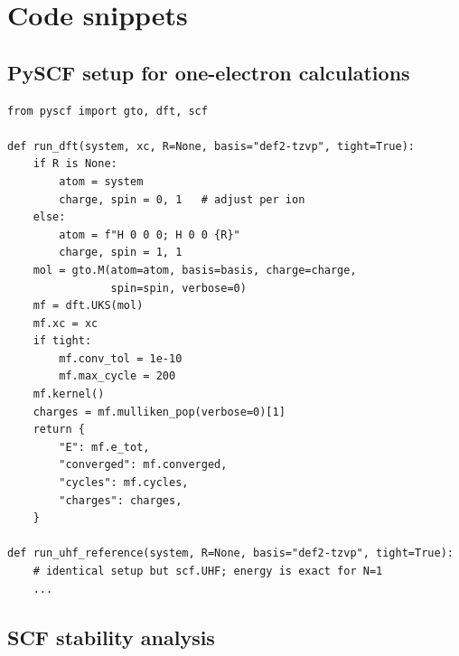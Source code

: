 \documentclass[11pt]{report}
\theoremstyle{definition}
\theoremstyle{remark}
\begin{document}
\appendix

\chapter{Code snippets}

\section{PySCF setup for one-electron calculations}

\begin{verbatim}
from pyscf import gto, dft, scf

def run_dft(system, xc, R=None, basis="def2-tzvp", tight=True):
    if R is None:
        atom = system
        charge, spin = 0, 1   # adjust per ion
    else:
        atom = f"H 0 0 0; H 0 0 {R}"
        charge, spin = 1, 1
    mol = gto.M(atom=atom, basis=basis, charge=charge,
                spin=spin, verbose=0)
    mf = dft.UKS(mol)
    mf.xc = xc
    if tight:
        mf.conv_tol = 1e-10
        mf.max_cycle = 200
    mf.kernel()
    charges = mf.mulliken_pop(verbose=0)[1]
    return {
        "E": mf.e_tot,
        "converged": mf.converged,
        "cycles": mf.cycles,
        "charges": charges,
    }

def run_uhf_reference(system, R=None, basis="def2-tzvp", tight=True):
    # identical setup but scf.UHF; energy is exact for N=1
    ...
\end{verbatim}

\section{SCF stability analysis}
\end{document}
